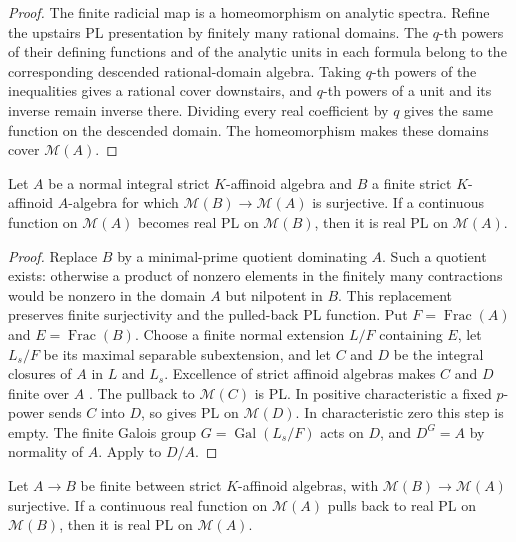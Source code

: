 \documentclass[11pt,a4paper]{amsart}
\begin{document}
\begin{proof}
The finite radicial map is a homeomorphism on analytic spectra. Refine the upstairs PL presentation by finitely many rational domains. The $q$-th powers of their defining functions and of the analytic units in each formula belong to the corresponding descended rational-domain algebra. Taking $q$-th powers of the inequalities gives a rational cover downstairs, and $q$-th powers of a unit and its inverse remain inverse there. Dividing every real coefficient by $q$ gives the same function on the descended domain. The homeomorphism makes these domains cover $\mathcal M(A)$.
\end{proof}

\begin{proposition}\label{prop:normal-finite-descent}
Let $A$ be a normal integral strict $K$-affinoid algebra and $B$ a finite strict $K$-affinoid $A$-algebra for which $\mathcal M(B)\to\mathcal M(A)$ is surjective. If a continuous function on $\mathcal M(A)$ becomes real PL on $\mathcal M(B)$, then it is real PL on $\mathcal M(A)$.
\end{proposition}

\begin{proof}
Replace $B$ by a minimal-prime quotient dominating $A$. Such a quotient exists: otherwise a product of nonzero elements in the finitely many contractions would be nonzero in the domain $A$ but nilpotent in $B$. This replacement preserves finite surjectivity and the pulled-back PL function. Put $F=\operatorname{Frac}(A)$ and $E=\operatorname{Frac}(B)$. Choose a finite normal extension $L/F$ containing $E$, let $L_s/F$ be its maximal separable subextension, and let $C$ and $D$ be the integral closures of $A$ in $L$ and $L_s$. Excellence of strict affinoid algebras makes $C$ and $D$ finite over $A$ \cite[proof of Theorem~1.3.1]{Berkovich15Finiteness}. The pullback to $\mathcal M(C)$ is PL. In positive characteristic a fixed $p$-power sends $C$ into $D$, so  gives PL on $\mathcal M(D)$. In characteristic zero this step is empty. The finite Galois group $G=\operatorname{Gal}(L_s/F)$ acts on $D$, and $D^G=A$ by normality of $A$. Apply  to $D/A$.
\end{proof}

\begin{theorem}\label{thm:finite-descent}
Let $A\to B$ be finite between strict $K$-affinoid algebras, with $\mathcal M(B)\to\mathcal M(A)$ surjective. If a continuous real function on $\mathcal M(A)$ pulls back to real PL on $\mathcal M(B)$, then it is real PL on $\mathcal M(A)$.
\end{theorem}
\end{document}
